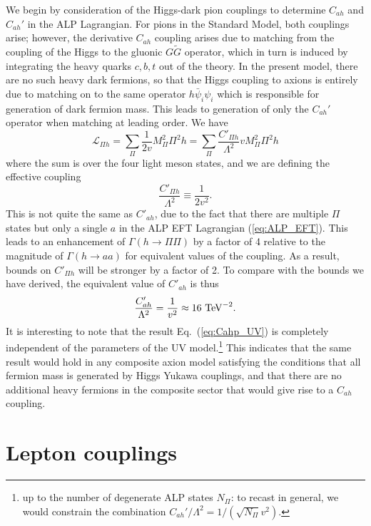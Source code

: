 We begin by consideration of the Higgs-dark pion couplings to determine $C_{ah}$ and $C_{ah}'$ in the ALP Lagrangian.  For pions in the Standard Model, both couplings arise; however, the derivative $C_{ah}$ coupling arises due to matching from the coupling of the Higgs to the gluonic $G \tilde{G}$ operator, which in turn is induced by integrating the heavy quarks $c,b,t$ out of the theory.  In the present model, there are no such heavy dark fermions, so that the Higgs coupling to axions is entirely due to matching on to the same operator $h \bar{\psi}_i \psi_i$ which is responsible for generation of dark fermion mass.  This leads to generation of only the $C_{ah}'$ operator when matching at leading order.  We have
%
\begin{equation}
\mathcal{L}_{\Pi h} = \sum_{\Pi} \frac{1}{2v} M_\Pi^2 \Pi^2 h =  \sum_{\Pi} \frac{C'_{\Pi h}}{\Lambda^2} v M_\Pi^2 \Pi^2 h
\end{equation}
%
where the sum is over the four light meson states, and we are defining the effective coupling
%
\begin{equation}
\frac{C'_{\Pi h}}{\Lambda^2} \equiv \frac{1}{2v^2}.
\end{equation}
%
This is not quite the same as $C'_{ah}$, due to the fact that there are multiple $\Pi$ states but only a single $a$ in the ALP EFT Lagrangian (\ref{eq:ALP_EFT}).  This leads to an enhancement of $\Gamma(h \rightarrow \Pi \Pi)$ by a factor of 4 relative to the magnitude of $\Gamma(h \rightarrow aa)$ for equivalent values of the coupling.  As a result, bounds on $C'_{\Pi h}$ will be stronger by a factor of 2.  To compare with the bounds we have derived, the equivalent value of $C'_{ah}$ is thus
%
\begin{equation} \label{eq:Cahp_UV}
\frac{C_{ah}'}{\Lambda^2} = \frac{1}{v^2} \approx 16\ {\rm TeV}^{-2}.
\end{equation}
%
It is interesting to note that the result Eq.~(\ref{eq:Cahp_UV}) is completely independent of the parameters of the UV model.\footnote{up to the number of degenerate ALP states $N_\Pi$: to recast in general, we would constrain the combination $C_{ah}' / \Lambda^2 = 1/({\sqrt{N_\Pi} v^2})$.}  This indicates that the same result would hold in any composite axion model satisfying the conditions that all fermion mass is generated by Higgs Yukawa couplings, and that there are no additional heavy fermions in the composite sector that would give rise to a $C_{ah}$ coupling.


\section{Lepton couplings}

